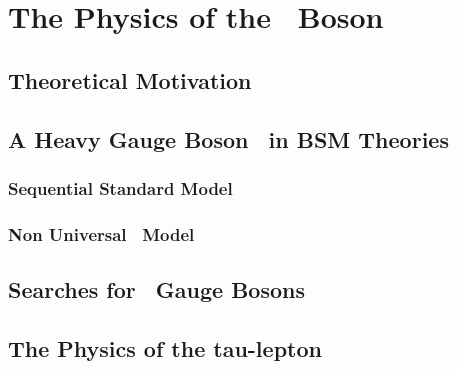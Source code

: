 \chapter[The Physics Of The \Zprime~Boson]{The Physics of the \Zprime~Boson}
\label{chap:Zp}

\section{Theoretical Motivation}
\label{sec:Motivation}

\section{A Heavy Gauge Boson \Zprime~in BSM Theories}
\label{sec:Models}

\subsection{Sequential Standard Model}
\label{subsec:SSM}

\subsection{Non Universal \Zprime~Model}
\label{subsec:Models}

\section{Searches for \Zprime~Gauge Bosons}
\label{sec:Models}


\section{The Physics of the tau-lepton}
\label{sec:Taus}

